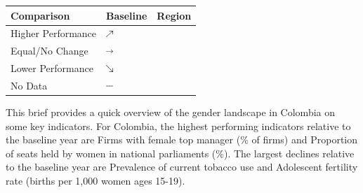 \documentclass[
]{article}
\author{}
\date{\vspace{-2.5em}}
\begin{document}
\begin{table}\begingroup\fontsize{8}{10}\selectfont

\begin{tabular}[t]{lll}

\textbf{Comparison} & \textbf{Baseline} & \textbf{Region}\\
\midrule
Higher Performance & \includegraphics[width=0.1in, height=0.1in]{upicon.png} & \cellcolor[HTML]{46F884}{}\\
Equal/No Change & \includegraphics[width=0.1in, height=0.1in]{righticon.png} & \cellcolor[HTML]{E1DD37}{}\\
Lower Performance & \includegraphics[width=0.1in, height=0.1in]{downicon.png} & \cellcolor[HTML]{F05B12}{}\\
No Data & \includegraphics[width=0.1in, height=0.1in]{naicon.png} & \cellcolor{lightgray}{}\\

\end{tabular}
\endgroup{}\end{table}
\fontsize{9}{8}\selectfont

This brief provides a quick overview of the gender landscape in Colombia
on some key indicators. For Colombia, the highest performing indicators
relative to the baseline year are Firms with female top manager (\% of
firms) and Proportion of seats held by women in national parliaments
(\%). The largest declines relative to the baseline year are Prevalence
of current tobacco use and Adolescent fertility rate (births per 1,000
women ages 15-19). \normalsize \vspace{2pt}

\renewcommand{\arraystretch}{1.15}

\begingroup\fontsize{8}{10}\selectfont
\end{document}
